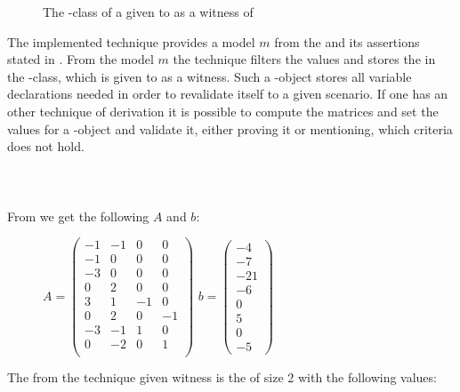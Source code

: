 \begin{wrapfigure}{R}{0.5\textwidth}
	\centering
	
	\caption{The -class of a \gna given to \aprove as a witness of \nonterm}	
	\label{dia:gna-classdiagram}
\end{wrapfigure}
The implemented technique provides a model $m$ from the \solver and its assertions stated in . From the model $m$ the technique filters the values and stores the in the \gna-class, which is given to \aprove as a witness. Such a \gna-object stores all variable declarations needed in order to revalidate itself to a given scenario. If one has an other technique of derivation it is possible to compute the matrices and set the values for a \gna-object and validate it, either proving it or mentioning, which criteria does not hold.\\ 
\\
\\
\\
From  we get the following \iterationmatrix $A$ and \iterationconstants $b$: 
\begin{figure}[H]
	\centering
	$A=\begin{pmatrix}
		-1 		& -1 		&  0		& 0		 \\
		-1 		& 0 		&  0		& 0		 \\
		-3 		& 0 		&  0		& 0		 \\
		0 		& 2 		&  0		& 0		 \\
		3 		& 1 		&  -1		& 0		 \\
		0 		& 2 		&  0		& -1	 \\
		-3 		& -1 		&  1		& 0		 \\
		0 		& -2 		&  0		& 1	 	 \\
	\end{pmatrix}$	
	$b=\begin{pmatrix}
		-4 \\ -7 \\ -21 \\ -6 \\ 0 \\ 5 \\ 0 \\ -5
	\end{pmatrix}$
\end{figure}
The from the technique given witness is the \gna of size 2 with the following values:
